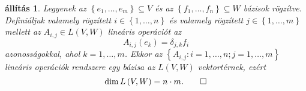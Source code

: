 \documentclass[9pt, a4paper, showtrims]{memoir}
\theoremstyle{plain}
\newtheorem{proposition}{állítás}[chapter]
\theoremstyle{remark}
\theoremstyle{definition}
\begin{document}
\begin{proposition}
    Legyenek az $\left\{ e_1,\dots,e_m \right\}\subseteq V$ és az
    $\left\{ f_1,\dots,f_n \right\}\subseteq W$ bázisok rögzítve.
    Definiáljuk valamely rögzített $i\in\left\{ 1,\dots,n \right\}$ és valamely rögzített
    $j\in \left\{ 1,\dots,m \right\}$ mellett az $A_{i,j}\in L\left( V,W \right)$ lineáris operációt az
    \begin{equation}
        A_{i,j}\left( e_k \right)=\delta_{j,k}f_i
        \label{eq:aij}
    \end{equation}
    azonosságokkal, ahol $k=1,\dots,m$.
    Ekkor az $\left\{ A_{i,j}: i=1,\dots,n;j=1,\dots,m \right\}$
    lineáris operációk rendszere egy bázisa az $L\left( V,W \right)$ vektortérnek,
    ezért 
    \[
        \dim L\left( V,W \right)=n\cdot m.\qedhere
    \]
\end{proposition}
\end{document}
